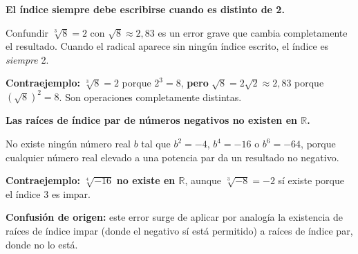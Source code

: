 \documentclass[11pt, letterpaper]{article}
\begin{document}
\begin{tcolorbox}[warningbox, title={Error frecuente — omitir o confundir el índice}]
\textbf{El índice siempre debe escribirse cuando es distinto de 2.}

Confundir $\sqrt[3]{8} = 2$ con $\sqrt{8} \approx 2{,}83$ es un error grave que cambia completamente el resultado. Cuando el radical aparece sin ningún índice escrito, el índice es \emph{siempre} 2.

\medskip
\textbf{Contraejemplo:} $\sqrt[3]{8} = 2$ porque $2^3 = 8$, \textbf{pero} $\sqrt{8} = 2\sqrt{2} \approx 2{,}83$ porque $(\sqrt{8})^2 = 8$. Son operaciones completamente distintas.
\end{tcolorbox}

\begin{tcolorbox}[warningbox, title={Error frecuente — raíz par de número negativo}]
\textbf{Las raíces de índice par de números negativos no existen en $\mathbb{R}$.}

No existe ningún número real $b$ tal que $b^2 = -4$, $b^4 = -16$ o $b^6 = -64$, porque cualquier número real elevado a una potencia par da un resultado no negativo.

\medskip
\textbf{Contraejemplo:} $\sqrt[4]{-16}$ \textbf{no existe en $\mathbb{R}$}, aunque $\sqrt[3]{-8} = -2$ sí existe porque el índice 3 es impar.

\medskip
\textbf{Confusión de origen:} este error surge de aplicar por analogía la existencia de raíces de índice impar (donde el negativo sí está permitido) a raíces de índice par, donde no lo está.
\end{tcolorbox}
\end{document}
